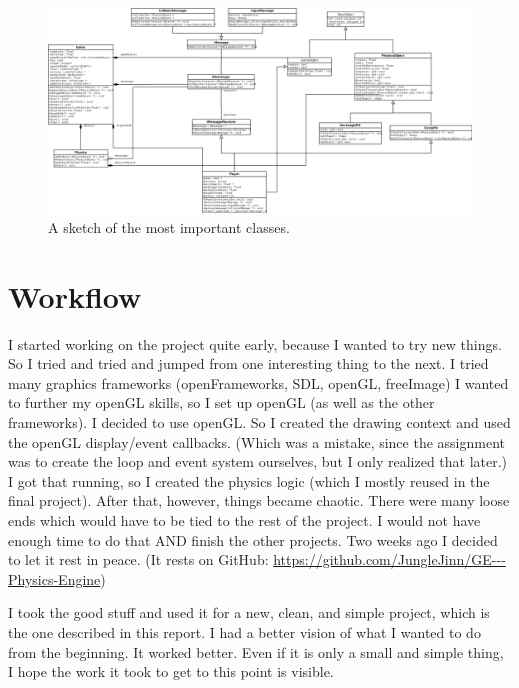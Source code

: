 \documentclass[12pt]{article}
\begin{document}
\begin{figure}[H]
	\centering
	\includegraphics[totalheight=0.45\textheight, angle=90]{classes.png}
	\caption{A sketch of the most important classes.}
	\label{figure:classes}
\end{figure}

\section{Workflow}
\label{section:workflow}

I started working on the project quite early, because I wanted to try new things. So I tried and tried and jumped from one interesting thing to the next. I tried many graphics frameworks (openFrameworks, SDL, openGL, freeImage) I wanted to further my openGL skills, so I set up openGL (as well as the other frameworks). I decided to use openGL. So I created the drawing context and used the openGL display/event callbacks. (Which was a mistake, since the assignment was to create the loop and event system ourselves, but I only realized that later.) I got that running, so I created the physics logic (which I mostly reused in the final project). After that, however, things became chaotic. There were many loose ends which would have to be tied to the rest of the project. I would not have enough time to do that AND finish the other projects. Two weeks ago I decided to let it rest in peace. (It rests on GitHub: \url{https://github.com/JungleJinn/GE---Physics-Engine})

I took the good stuff and used it for a new, clean, and simple project, which is the one described in this report. I had a better vision of what I wanted to do from the beginning. It worked better. Even if it is only a small and simple thing, I hope the work it took to get to this point is visible.

\newpage
\lstlistoflistings
\listoffigures
\end{document}
